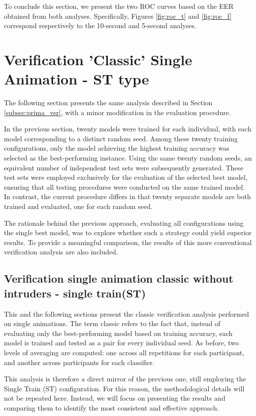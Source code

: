 \documentclass[12pt]{report}
\begin{document}
To conclude this section, we present the two ROC curves based on the EER obtained from both analyses.
Specifically, Figures \ref{fig:roc_t} and \ref{fig:roc_f} correspond respectively to the 10-second and 5-second analyses.
\FloatBarrier

\section{Verification 'Classic' Single Animation - ST type}

The following section presents the same analysis described in Section \ref{subsec:prima_ver}, with a minor modification in the evaluation procedure.

In the previous section, twenty models were trained for each individual, with each model corresponding to a distinct random seed.
Among these twenty training configurations, only the model achieving the highest training accuracy was selected as the best-performing instance.
Using the same twenty random seeds, an equivalent number of independent test sets were subsequently generated.
These test sets were employed exclusively for the evaluation of the selected best model, ensuring that all testing procedures were conducted on the same trained model.
In contrast, the current procedure differs in that twenty separate models are both trained and evaluated, one for each random seed.

The rationale behind the previous approach, evaluating all configurations using the single best model, was to explore whether such a strategy could yield superior results.
To provide a meaningful comparison, the results of this more conventional verification analysis are also included.

\subsection{Verification single animation classic without intruders - single train(ST)}
\label{subsec:s_vs_cst}

This and the following sections present the classic verification analysis performed on single animations.
The term classic refers to the fact that, instead of evaluating only the best-performing model based on training accuracy, each model is trained and tested as a pair for every individual seed.
As before, two levels of averaging are computed: one across all repetitions for each participant, and another across participants for each classifier.

This analysis is therefore a direct mirror of the previous one, still employing the Single Train (ST) configuration.
For this reason, the methodological details will not be repeated here.
Instead, we will focus on presenting the results and comparing them to identify the most consistent and effective approach.
\end{document}
